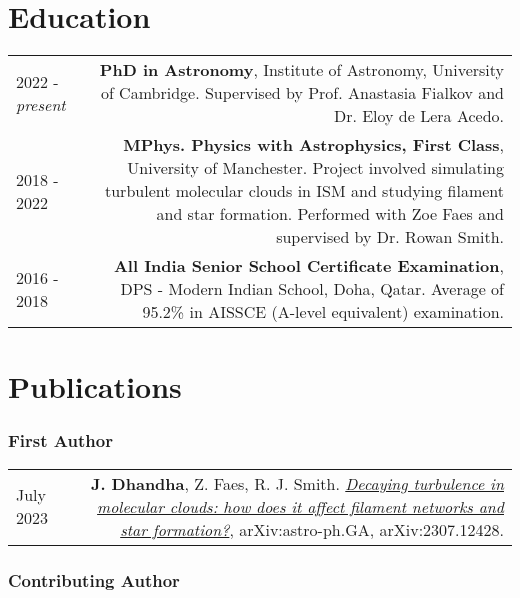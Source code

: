 \documentclass{article}
\begin{document}
\section*{Education}
\begin{tabular}{L!{\vrule}R}
	2022 - \textit{present} & \textbf{PhD in Astronomy}, Institute of Astronomy, University of Cambridge. Supervised by Prof. Anastasia Fialkov and Dr. Eloy de Lera Acedo. \\
	2018 - 2022 & \textbf{MPhys. Physics with Astrophysics, First Class}, University of Manchester. Project involved simulating turbulent molecular clouds in ISM and studying filament and star formation. Performed with Zoe Faes and supervised by Dr. Rowan Smith. \\
	2016 - 2018 & \textbf{All India Senior School Certificate Examination}, DPS - Modern Indian School, Doha, Qatar. Average of 95.2\% in AISSCE (A-level equivalent) examination.
\end{tabular}

\section*{Publications}

\subsubsection*{First Author}

\begin{tabular}{L!{\vrule}R}

    July 2023 & \textbf{J. Dhandha}, Z. Faes, R. J. Smith. \href{https://arxiv.org/abs/2307.12428}{\textit{Decaying turbulence in molecular clouds: how does it affect filament networks and star formation?}}, arXiv:astro-ph.GA, arXiv:2307.12428. \\

\end{tabular}

\subsubsection*{Contributing Author}
\end{document}
